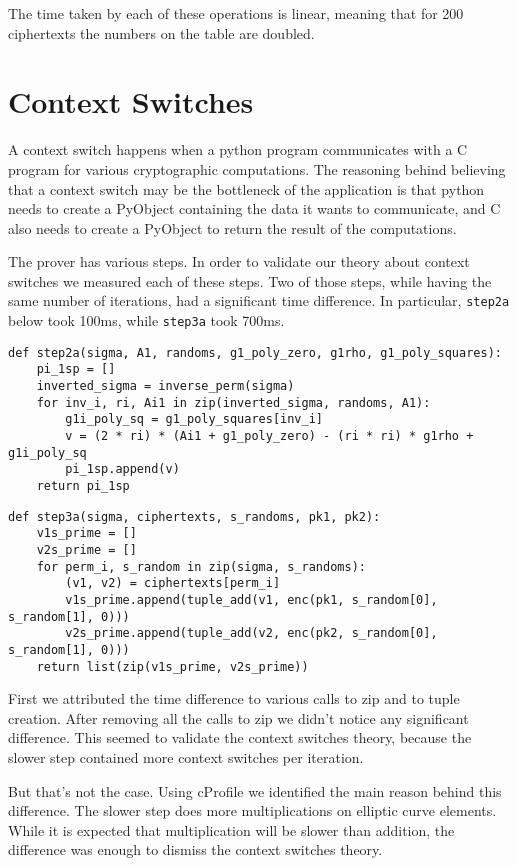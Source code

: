 \documentclass{article}
\begin{document}
The time taken by each of these operations is linear, meaning that for
200 ciphertexts the numbers on the table are doubled.

\section{Context Switches}

A context switch happens when a python program communicates with a C
program for various cryptographic computations. The reasoning behind
believing that a context switch may be the bottleneck of the application
is that python needs to create a PyObject containing the
data it wants to communicate, and C also needs to create a PyObject to
return the result of the computations.

The prover has various steps. In order to validate our theory about
context switches we measured each of these steps. Two of those steps,
while having the same number of iterations, had a significant time
difference. In particular, \texttt{step2a} below took
100ms, while \texttt{step3a} took 700ms.

\begin{verbatim}
def step2a(sigma, A1, randoms, g1_poly_zero, g1rho, g1_poly_squares):
    pi_1sp = []
    inverted_sigma = inverse_perm(sigma)
    for inv_i, ri, Ai1 in zip(inverted_sigma, randoms, A1):
        g1i_poly_sq = g1_poly_squares[inv_i]
        v = (2 * ri) * (Ai1 + g1_poly_zero) - (ri * ri) * g1rho + g1i_poly_sq
        pi_1sp.append(v)
    return pi_1sp
  \end{verbatim}

\begin{verbatim}
def step3a(sigma, ciphertexts, s_randoms, pk1, pk2):
    v1s_prime = []
    v2s_prime = []
    for perm_i, s_random in zip(sigma, s_randoms):
        (v1, v2) = ciphertexts[perm_i]
        v1s_prime.append(tuple_add(v1, enc(pk1, s_random[0], s_random[1], 0)))
        v2s_prime.append(tuple_add(v2, enc(pk2, s_random[0], s_random[1], 0)))
    return list(zip(v1s_prime, v2s_prime))
\end{verbatim}
  
\noindent
First we attributed the time difference to various calls to zip and to tuple
creation. After removing all the calls to zip we didn't notice any significant
difference. This seemed to validate the context switches theory, because the
slower step contained more context switches per iteration.

But that's not the case. Using cProfile we identified the main
reason behind this difference. The slower step does more multiplications on
elliptic curve elements. While it is expected that multiplication will be slower
than addition, the difference was enough to dismiss the context switches theory.
\end{document}
